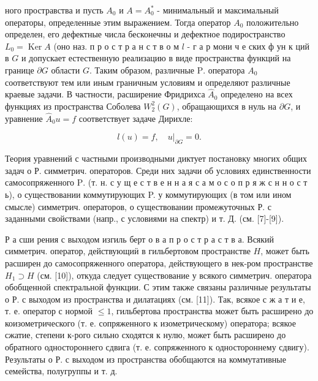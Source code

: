 \documentclass[10pt]{article}
\begin{document}
ного простравства и пусть $A_{0}$ и $A=A_{0}^{*}$ - минимальный и максимальный операторы, определенные этим выражением. Тогда оператор $A_{0}$ положительно определен, его дефектные числа бесконечны и дефектное подиространство $L_{0}=\operatorname{Ker} A$ (оно наз. п р о с т р а н с т в о м $l$ - г а р мони ч е ских ф ун к ций в $G$ и допускает естественную реализацию в виде пространства функций на границе $\partial G$ области $G$. Таким образом, различные $\mathrm{P}$. оператора $A_{0}$ соответствуют тем или иным граничным условиям и определяют различные краевые задачи. В частности, расширение Фридрихса $\widehat{A}_{0}$ определено на всех функциях из пространства Соболева $W_{2}^{2}(G)$, обращающихся в нуль на $\partial G$, и уравнение $\hat{A}_{0} u=f$ соответствует задаче Дирихле:



\[

l(u)=f,\left.\quad u\right|_{\partial G}=0 .

\]



Теория уравнений с частными производными диктует постановку многих общих задач о Р. симметрич. операторов. Среди них задачи об условиях единственности самосопряженного $\mathrm{P}$. (т. н. с у щ е с т в е н н а я с а м о с о п р я ж с н н о с т ь), о существовании коммутирующих P. у коммутирующих (в том или ином смысле) симметрич. операторов, о существовании промежуточных Р. с заданными свойствами (напр., с условиями на спектр) и т. Д. (см. [7]-[9]).



Р а сши рения с выходом изгиль берт о в а п р о с т р а с т в а. Всякий симметрич. оператор, действующиӥ в гильбертовом пространстве $H$, может быть расширен до самосопряженного оператора, действующего в нек-ром пространстве $H_{1} \supset H$ (см. [10]), откуда следует существование у всякого симметрич. оператора обобщенной спектральной функции. С этим также связаны различные результаты о Р. с выходом из пространства и дилатациях (см. [11]). Так, всякое с ж а т и е, т. е. оператор с нормой $\leqslant 1$, гильбертова пространства может быть расширено до коизометрического (т. е. сопряженного к изометрическому) оператора; всякое сжатие, степени к-рого сильно сходятся к нулю, может быть расширено до обратного одностороннего сдвига (т. е. сопряженного к одностороннему сдвигу). Результаты о Р. с выходом из пространства обобщаются на коммутативные семейства, полугруппы и т. д.
\end{document}
